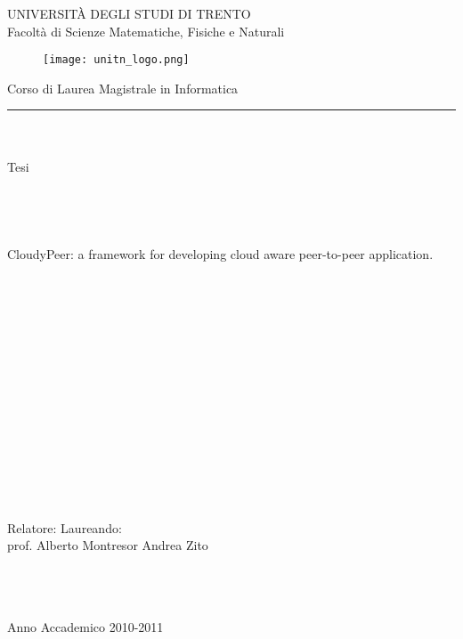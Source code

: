 \documentclass [11pt, a4paper]{report}
\begin{document}
\begin{titlepage}
\begin{center}
\LARGE
UNIVERSIT\`A DEGLI STUDI DI TRENTO\\
\large
Facolt\`a di Scienze Matematiche, Fisiche e Naturali\\
\begin{figure}[htbp]
\centering
\texttt{[image: unitn\_logo.png]}
\end{figure}
\large
Corso di Laurea Magistrale in Informatica\\
\rule{\linewidth}{0.5mm}
\ \\ \ \\
Tesi\\
\ \\ \ \\ \ \\ \ \\
\Large
CloudyPeer: a framework for developing cloud aware peer-to-peer
application.
\end{center}

\ \\ \ \\ \ \\ \ \\ \ \\ \ \\ \ \\ \ \\ \ \\ \ \\ \ \\ \ \\ \ \\ \ \\
\large
\flushleft \large Relatore:  \large Laureando:\\
\large prof. Alberto Montresor    \large Andrea Zito\\

\normalsize
\ \\ \ \\ \ \\
\begin{center}
 Anno Accademico 2010-2011
\end{center}
\end{titlepage}

\tableofcontents









{}

\end{document}
